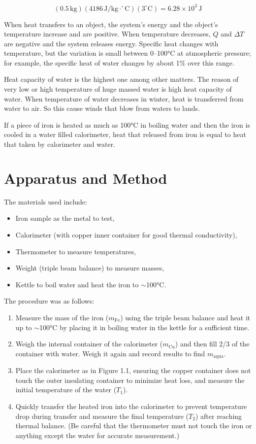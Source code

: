 \documentclass[12pt, a4paper]{article}
\begin{document}
\[ (0.5 \, \text{kg})(4186 \, \text{J/kg}\cdot^\circ\text{C})(3^\circ\text{C}) = 6.28 \times 10^3 \, \text{J} \]

When heat transfers to an object, the system's energy and the object's temperature increase and are positive. When temperature decreases, $Q$ and $\Delta T$ are negative and the system releases energy. Specific heat changes with temperature, but the variation is small between 0--100°C at atmospheric pressure; for example, the specific heat of water changes by about 1\% over this range.

Heat capacity of water is the highest one among other matters. The reason of very low or high temperature of huge massed water is high heat capacity of water. When temperature of water decreases in winter, heat is transferred from water to air. So this cause winds that blow from waters to lands.

If a piece of iron is heated as much as 100°C in boiling water and then the iron is cooled in a water filled calorimeter, heat that released from iron is equal to heat that taken by calorimeter and water.

\section{Apparatus and Method}
The materials used include:
\begin{itemize}
\item Iron sample as the metal to test,
\item Calorimeter (with copper inner container for good thermal conductivity),
\item Thermometer to measure temperatures,
\item Weight (triple beam balance) to measure masses,
\item Kettle to boil water and heat the iron to $\sim$100°C.
\end{itemize}

The procedure was as follows:
\begin{enumerate}
\item Measure the mass of the iron ($m_{\text{Fe}}$) using the triple beam balance and heat it up to $\sim$100°C by placing it in boiling water in the kettle for a sufficient time.
\item Weigh the internal container of the calorimeter ($m_{\text{Cu}}$) and then fill 2/3 of the container with water. Weigh it again and record results to find $m_{\text{aqua}}$.
\item Place the calorimeter as in Figure 1.1, ensuring the copper container does not touch the outer insulating container to minimize heat loss, and measure the initial temperature of the water ($T_1$).
\item Quickly transfer the heated iron into the calorimeter to prevent temperature drop during transfer and measure the final temperature ($T_2$) after reaching thermal balance. (Be careful that the thermometer must not touch the iron or anything except the water for accurate measurement.)
\end{enumerate}
\end{document}
